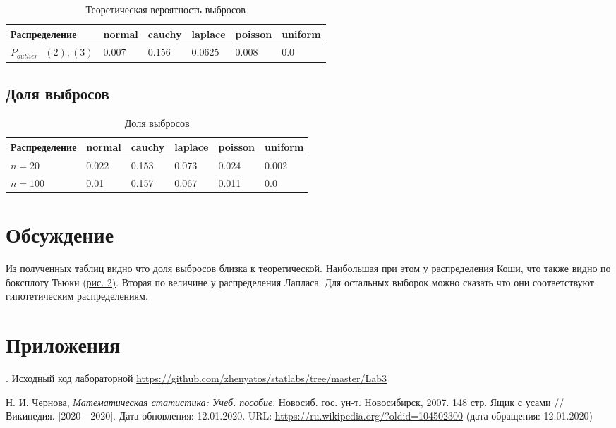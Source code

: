 \documentclass[12pt,a4paper]{article}
\begin{document}
\begin{table}[h!]
	\centering
	\begin{tabular}{|l|l|l|l|l|l|}
		\hline
		Распределение&normal&cauchy&laplace&poisson&uniform  \\ \hline
		$P_{outlier}\text{	} \hyperref[2]{(2)},\hyperref[3]{(3)}$
		&0.007  &0.156  &0.0625  &0.008  &0.0  \\ \hline
	\end{tabular}
	\caption{Теоретическая вероятность выбросов}
\end{table}

\subsection{Доля выбросов}
\begin{table}[h!]
	\centering
	\begin{tabular}{|l|l|l|l|l|l|}
		\hline
		Распределение&normal&cauchy&laplace&poisson&uniform  \\ \hline
		$n=20$
		&0.022  &0.153  &0.073  &0.024  &0.002  \\ \hline
		$n=100$
		&0.01  &0.157  &0.067  &0.011  &0.0  \\ \hline
	\end{tabular}
	\caption{Доля выбросов}
\end{table}

\pagebreak

\section{Обсуждение}
Из полученных таблиц видно что доля выбросов близка к теоретической. Наибольшая при этом у распределения Коши, что также видно по боксплоту Тьюки \hyperref[fig:image:cauchy]{(рис. 2)}. Вторая по величине у распределения Лапласа. Для остальных выборок можно сказать что они соответствуют гипотетическим распределениям.

\pagebreak

\section{Приложения}
. Исходный код лабораторной {\url{https://github.com/zhenyatos/statlabs/tree/master/Lab3}}

\begin{thebibliography}{9} 
	 Н. И. Чернова, \emph{Математическая статистика: Учеб. пособие}. Новосиб. гос. ун-т. Новосибирск, 2007. 148 стр.
	 Ящик с усами // Википедия. [2020—2020]. Дата обновления: 12.01.2020. URL: \url{https://ru.wikipedia.org/?oldid=104502300} (дата обращения: 12.01.2020)
\end{thebibliography}
\end{document}
